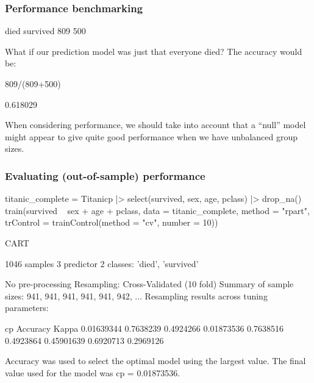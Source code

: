 \documentclass[a4paper]{article}\usepackage[]{graphicx}\usepackage[]{xcolor}
\begin{document}
\subsubsection{Performance benchmarking}
\begin{Schunk}
\begin{Soutput}

    died survived 
     809      500 
\end{Soutput}
\end{Schunk}
What if our prediction model was just that everyone died? The accuracy would be:
\begin{Schunk}
\begin{Sinput}
809/(809+500)
\end{Sinput}
\begin{Soutput}
[1] 0.618029
\end{Soutput}
\end{Schunk}
When considering performance, we should take into account that a ``null'' model might appear to give quite good performance when we have unbalanced group sizes.
\subsubsection{Evaluating (out-of-sample) performance}
\begin{Schunk}
\begin{Sinput}
titanic_complete = Titanicp |> select(survived, sex, age, pclass) |> drop_na()
train(survived ~ sex + age + pclass, data = titanic_complete,
      method = "rpart", trControl = trainControl(method = "cv", number = 10))
\end{Sinput}
\begin{Soutput}
CART 

1046 samples
   3 predictor
   2 classes: 'died', 'survived' 

No pre-processing
Resampling: Cross-Validated (10 fold) 
Summary of sample sizes: 941, 941, 941, 941, 941, 942, ... 
Resampling results across tuning parameters:

  cp          Accuracy   Kappa    
  0.01639344  0.7638239  0.4924266
  0.01873536  0.7638516  0.4923864
  0.45901639  0.6920713  0.2969126

Accuracy was used to select the optimal model using the largest value.
The final value used for the model was cp = 0.01873536.
\end{Soutput}
\end{Schunk}
\end{document}
